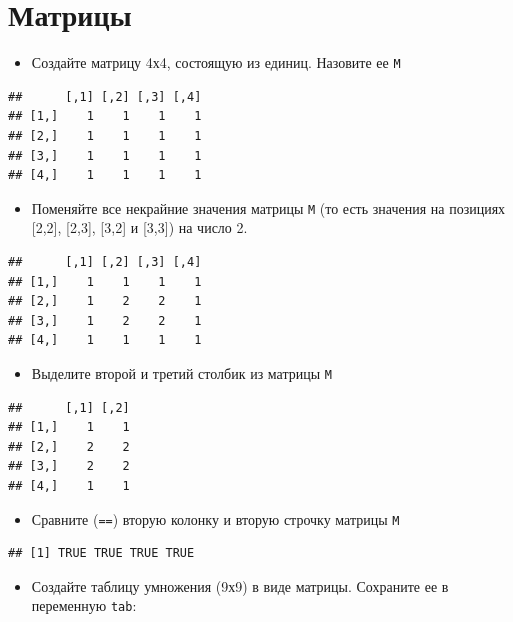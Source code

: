 \documentclass[]{book}
\providecommand{\tightlist}{%
  \setlength{\itemsep}{0pt}\setlength{\parskip}{0pt}}
\begin{document}
\section{Матрицы}\label{t}

\begin{itemize}
\tightlist
\item
  Создайте матрицу 4х4, состоящую из единиц. Назовите ее \texttt{M}
\end{itemize}

\begin{verbatim}
##      [,1] [,2] [,3] [,4]
## [1,]    1    1    1    1
## [2,]    1    1    1    1
## [3,]    1    1    1    1
## [4,]    1    1    1    1
\end{verbatim}

\begin{itemize}
\tightlist
\item
  Поменяйте все некрайние значения матрицы \texttt{M} (то есть значения
  на позициях {[}2,2{]}, {[}2,3{]}, {[}3,2{]} и {[}3,3{]}) на число 2.
\end{itemize}

\begin{verbatim}
##      [,1] [,2] [,3] [,4]
## [1,]    1    1    1    1
## [2,]    1    2    2    1
## [3,]    1    2    2    1
## [4,]    1    1    1    1
\end{verbatim}

\begin{itemize}
\tightlist
\item
  Выделите второй и третий столбик из матрицы \texttt{M}
\end{itemize}

\begin{verbatim}
##      [,1] [,2]
## [1,]    1    1
## [2,]    2    2
## [3,]    2    2
## [4,]    1    1
\end{verbatim}

\begin{itemize}
\tightlist
\item
  Сравните (\texttt{==}) вторую колонку и вторую строчку матрицы
  \texttt{M}
\end{itemize}

\begin{verbatim}
## [1] TRUE TRUE TRUE TRUE
\end{verbatim}

\begin{itemize}
\tightlist
\item
  Создайте таблицу умножения (9х9) в виде матрицы. Сохраните ее в
  переменную \texttt{tab}:
\end{itemize}
\end{document}
